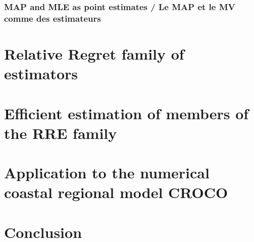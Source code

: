 \documentclass[11pt]{article}
\begin{document}
\subsubsection{MAP and MLE as point estimates / Le MAP et le MV comme des estimateurs}
\label{sec:org462f103}
\subsection{}
\label{sec:orgdb4be53}


\section{Relative Regret family of estimators}
\label{sec:orgbabf816}

\section{Efficient estimation of members of the RRE family}
\label{sec:org0aa4989}

\section{Application to the numerical coastal regional model CROCO}
\label{sec:orgd70bb13}

\section{Conclusion}
\label{sec:orgb7012d9}
\end{document}
